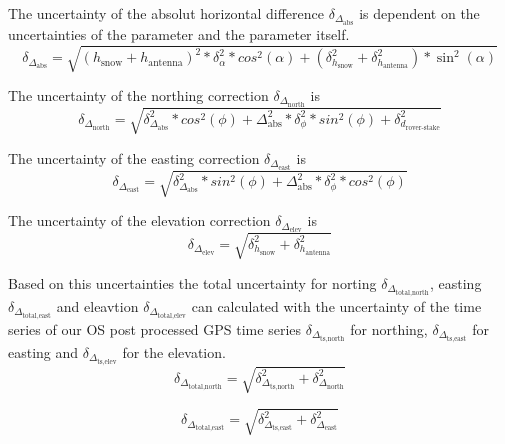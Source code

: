 The uncertainty of the absolut horizontal difference $\delta_{\Delta_{\text{abs}}}$ is dependent on the uncertainties of the parameter and the parameter itself.
\begin{equation}
	\delta_{\Delta_{\text{abs}}} = \sqrt{(h_{\text{snow}} + h_{\text{antenna}})^2 * \delta_{\alpha}^2 * cos^2(\alpha) + (\delta_{h_{\text{snow}}}^2 + \delta_{h_{\text{antenna}}}^2) * \sin^2(\alpha)}
\end{equation}

The uncertainty of the northing correction $\delta_{\Delta_{\text{north}}}$ is
\begin{equation}
	\delta_{\Delta_{\text{north}}} = \sqrt{\delta_{\Delta_{\text{abs}}}^2 * cos^2(\phi) + \Delta_{\text{abs}}^2 * \delta_{\phi}^2 * sin^2(\phi) + \delta_{d_{\text{rover-stake}}}^2}
\end{equation}

The uncertainty of the easting correction $\delta_{\Delta_{\text{east}}}$ is
\begin{equation}
	\delta_{\Delta_{\text{east}}} = \sqrt{\delta_{\Delta_{\text{abs}}}^2 * sin^2(\phi) + \Delta_{\text{abs}}^2 * \delta_{\phi}^2 * cos^2(\phi)}
\end{equation}

The uncertainty of the elevation correction $\delta_{\Delta_{\text{elev}}}$ is
\begin{equation}
\delta_{\Delta_{\text{elev}}} = \sqrt{\delta_{h_{\text{snow}}}^2 + \delta_{h_{\text{antenna}}}^2}
\end{equation}
	
Based on this uncertainties the total uncertainty for norting $\delta_{\Delta_{\text{total,north}}}$, easting $\delta_{\Delta_{\text{total,east}}}$ and eleavtion $\delta_{\Delta_{\text{total,elev}}}$ can calculated with the uncertainty of the time series of our OS post processed GPS time series $\delta_{\Delta_{\text{ts,north}}}$ for northing, $\delta_{\Delta_{\text{ts,east}}}$ for easting and $\delta_{\Delta_{\text{ts,elev}}}$ for the elevation.
\begin{equation}
	\delta_{\Delta_{\text{total,north}}} = \sqrt{\delta_{\Delta_{\text{ts,north}}}^2 + \delta_{\Delta_{\text{north}}}^2}
	\label{GPS:eq:errnorth}
\end{equation}

\begin{equation}
	\delta_{\Delta_{\text{total,east}}} = \sqrt{\delta_{\Delta_{\text{ts,east}}}^2 + \delta_{\Delta_{\text{east}}}^2}
	\label{GPS:eq:erreast}
\end{equation}

